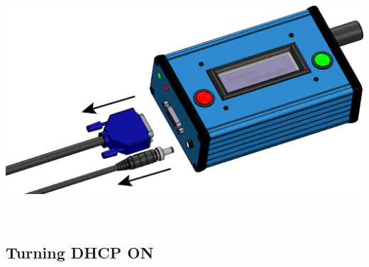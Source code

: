 \documentclass[11pt, oneside]{book}
\begin{document}
\begin{minipage}{0.45\textwidth} 
	\includegraphics[width=\linewidth]{../media/graphics/unplug_fla} 
\end{minipage}\\[\baselineskip]

\subsection{Turning DHCP ON}\label{subsec:enable_dhcp}
\end{document}
